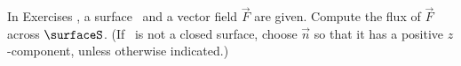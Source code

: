 {\noindent In Exercises}
{, a surface \surfaceS\ and a vector field $\vec F$ are given. Compute the flux of $\vec F$ across $\surfaceS$. (If \surfaceS\ is not a closed surface, choose $\vec n$ so that it has a positive $z$-component, unless otherwise indicated.)
}
